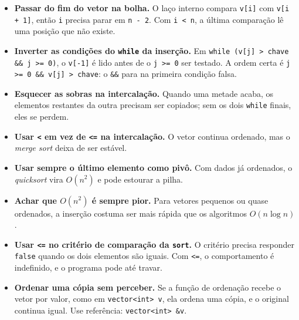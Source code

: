 \begin{itemize}
  \item \textbf{Passar do fim do vetor na bolha.} O laço interno compara \texttt{v[i]} com \texttt{v[i + 1]}, então \texttt{i} precisa parar em \texttt{n - 2}. Com \texttt{i < n}, a última comparação lê uma posição que não existe.
  \item \textbf{Inverter as condições do \texttt{while} da inserção.} Em \texttt{while (v[j] > chave \&\& j >= 0)}, o \texttt{v[-1]} é lido antes de o \texttt{j >= 0} ser testado. A ordem certa é \texttt{j >= 0 \&\& v[j] > chave}: o \texttt{\&\&} para na primeira condição falsa.
  \item \textbf{Esquecer as sobras na intercalação.} Quando uma metade acaba, os elementos restantes da outra precisam ser copiados; sem os dois \texttt{while} finais, eles se perdem.
  \item \textbf{Usar \texttt{<} em vez de \texttt{<=} na intercalação.} O vetor continua ordenado, mas o \textit{merge sort} deixa de ser estável.
  \item \textbf{Usar sempre o último elemento como pivô.} Com dados já ordenados, o \textit{quicksort} vira $O(n^2)$ e pode estourar a pilha.
  \item \textbf{Achar que $O(n^2)$ é sempre pior.} Para vetores pequenos ou quase ordenados, a inserção costuma ser mais rápida que os algoritmos $O(n \log n)$.
  \item \textbf{Usar \texttt{<=} no critério de comparação da \texttt{sort}.} O critério precisa responder \texttt{false} quando os dois elementos são iguais. Com \texttt{<=}, o comportamento é indefinido, e o programa pode até travar.
  \item \textbf{Ordenar uma cópia sem perceber.} Se a função de ordenação recebe o vetor por valor, como em \texttt{vector<int> v}, ela ordena uma cópia, e o original continua igual. Use referência: \texttt{vector<int> \&v}.
\end{itemize}
